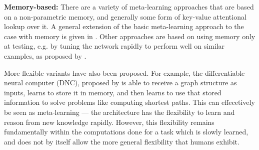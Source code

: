 \textbf{Memory-based:} There are a variety of meta-learning approaches that are based on a non-parametric memory, and generally some form of key-value attentional lookup over it. A general extension of the basic meta-learning approach to the case with memory is given in \citet{Santoro2016}. Other approaches are based on using memory only at testing, e.g. by tuning the network rapidly to perform well on similar examples, as proposed by \citet{Sprechmann2018}. \par 
More flexible variants have also been proposed. For example, the differentiable neural computer (DNC), proposed by \citet{Graves2016} is able to receive a graph structure as inputs, learns to store it in memory, and then learns to use that stored information to solve problems like computing shortest paths. This can effecetively be seen as meta-learning --- the architecture has the flexibility to learn and reason from new knowledge rapidly. However, this flexibility remains fundamentally within the computations done for a task which is slowly learned, and does not by itself allow the more general flexibility that humans exhibit. \par

